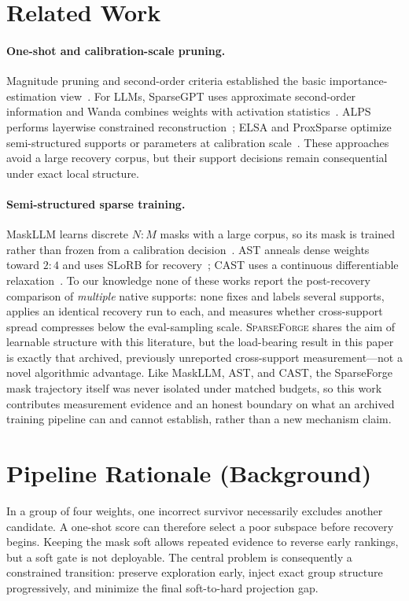 \documentclass{article}
\newcommand{\method}{\textsc{SparseForge}}
\begin{document}
\section{Related Work}
\paragraph{One-shot and calibration-scale pruning.}
Magnitude pruning and second-order criteria established the basic importance-estimation view~\citep{han2015magnitude,lecun1990obd,hassibi1993obs}. For LLMs, SparseGPT uses approximate second-order information and Wanda combines weights with activation statistics~\citep{frantar2023sparsegpt,sun2023wanda}. ALPS performs layerwise constrained reconstruction~\citep{meng2024alps}; ELSA and ProxSparse optimize semi-structured supports or parameters at calibration scale~\citep{lee2026elsa,liu2025proxsparse}. These approaches avoid a large recovery corpus, but their support decisions remain consequential under exact local structure.

\paragraph{Semi-structured sparse training.}
MaskLLM learns discrete $N{:}M$ masks with a large corpus, so its mask is trained rather than frozen from a calibration decision~\citep{fang2024maskllm}. AST anneals dense weights toward $2{:}4$ and uses SLoRB for recovery~\citep{huang2025ast}; CAST uses a continuous differentiable relaxation~\citep{huang2025cast}. To our knowledge none of these works report the post-recovery comparison of \emph{multiple} native supports: none fixes and labels several supports, applies an identical recovery run to each, and measures whether cross-support spread compresses below the eval-sampling scale. \method{} shares the aim of learnable structure with this literature, but the load-bearing result in this paper is exactly that archived, previously unreported cross-support measurement---not a novel algorithmic advantage. Like MaskLLM, AST, and CAST, the SparseForge mask trajectory itself was never isolated under matched budgets, so this work contributes measurement evidence and an honest boundary on what an archived training pipeline can and cannot establish, rather than a new mechanism claim.

\section{Pipeline Rationale (Background)}
In a group of four weights, one incorrect survivor necessarily excludes another candidate. A one-shot score can therefore select a poor subspace before recovery begins. Keeping the mask soft allows repeated evidence to reverse early rankings, but a soft gate is not deployable. The central problem is consequently a constrained transition: preserve exploration early, inject exact group structure progressively, and minimize the final soft-to-hard projection gap.
\end{document}
